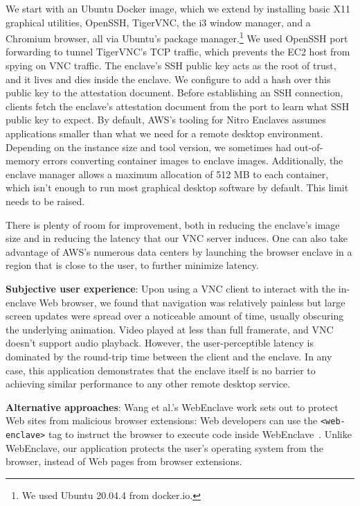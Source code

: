 We start with an Ubuntu Docker image, which we extend by installing basic X11
graphical utilities, OpenSSH, TigerVNC, the i3 window manager, and a Chromium
browser, all via Ubuntu's package manager.\footnote{We used Ubuntu 20.04.4 from
docker.io.}  We used OpenSSH port forwarding to tunnel TigerVNC's TCP traffic,
which prevents the EC2 host from spying on VNC traffic.  The enclave's SSH
public key acts as the root of trust, and it lives and dies inside the enclave.
We configure \tool{} to add a hash over this public key to the attestation
document.  Before establishing an SSH connection, clients fetch the enclave's
attestation document from the \tool{} port to learn what SSH public key to
expect.
%
By default, AWS's tooling for Nitro Enclaves assumes applications smaller than
what we need for a remote desktop environment.  Depending on the instance size
and tool version, we sometimes had out-of-memory errors converting container
images to enclave images.  Additionally, the enclave manager allows a maximum
allocation of 512 MB to each container, which isn't enough to run most graphical
desktop software by default.  This limit needs to be raised.

There is plenty of room for improvement, both in reducing the enclave's image
size and in reducing the latency that our VNC server induces.  One can also take
advantage of AWS's numerous data centers by launching the browser enclave in a
region that is close to the user, to further minimize latency.

\textbf{Subjective user experience}:
Upon using a VNC client to interact with the in-enclave Web browser, we found
that navigation was relatively painless but large screen updates were spread
over a noticeable amount of time, usually obscuring the underlying animation.
Video played at less than full framerate, and VNC doesn't support audio
playback.  However, the user-perceptible latency is dominated by the round-trip
time between the client and the enclave.  In any case, this application
demonstrates that the enclave itself is no barrier to achieving similar
performance to any other remote desktop service.

\textbf{Alternative approaches}:
Wang et al.'s WebEnclave work sets out to protect Web sites from malicious
browser extensions: Web developers can use the \texttt{<web-enclave>} tag to
instruct the browser to execute code inside WebEnclave~\cite{Wang2021a}.  Unlike
WebEnclave, our application protects the user's operating system from the
browser, instead of Web pages from browser extensions.
